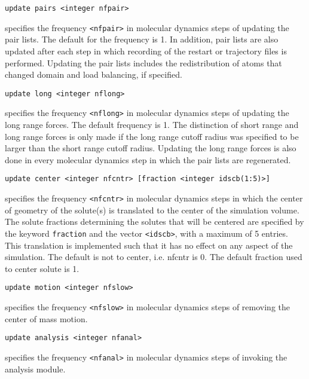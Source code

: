 \begin{description}
\item
\begin{verbatim}
update pairs <integer nfpair>
\end{verbatim}
specifies the frequency \verb+<nfpair>+ in molecular dynamics steps of 
updating the pair lists. The default for the frequency is 1.
In addition, pair lists are also updated after each step in which
recording of the restart or trajectory files is performed. Updating
the pair lists includes the redistribution of atoms that changed
domain and load balancing, if specified.

\item
\begin{verbatim}
update long <integer nflong>
\end{verbatim}
specifies the frequency \verb+<nflong>+ in molecular dynamics steps 
of updating the long range forces. The default frequency is 1.
The distinction of short range and long range forces is only
made if the long range cutoff radius was specified to be larger
than the short range cutoff radius. Updating the long range forces
is also done in every molecular dynamics step in which the
pair lists are regenerated.

\item
\begin{verbatim}
update center <integer nfcntr> [fraction <integer idscb(1:5)>]
\end{verbatim}
specifies the frequency \verb+<nfcntr>+ in molecular dynamics steps in 
which the center of geometry of the solute(s) is translated to the
center of the simulation volume. The solute fractions determining the
solutes that will be centered are specified by the keyword 
{\tt fraction} and the vector \verb+<idscb>+, with a maximum of 5 entries.
This translation is implemented such that it has no effect on any 
aspect of the simulation. The default is not to center, i.e. nfcntr is
0. The default fraction used to center solute is 1.

\item
\begin{verbatim}
update motion <integer nfslow>
\end{verbatim}
specifies the frequency \verb+<nfslow>+ in molecular dynamics steps of
removing the center of mass motion.

\item
\begin{verbatim}
update analysis <integer nfanal>
\end{verbatim}
specifies the frequency \verb+<nfanal>+ in molecular dynamics steps of
invoking the analysis module.


\end{description}
